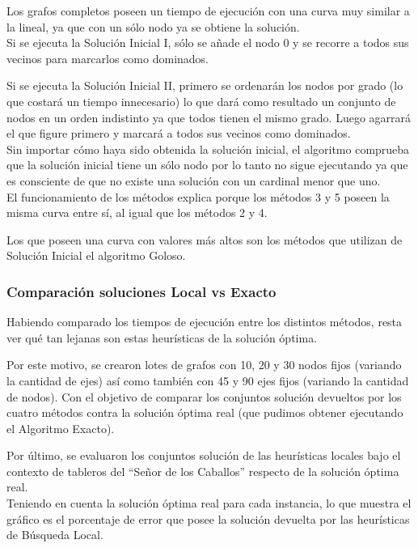 Los grafos completos poseen un tiempo de ejecución con una curva muy similar a la lineal, ya que con un sólo nodo ya se obtiene la solución.\\

Si se ejecuta la Solución Inicial I, sólo se añade el nodo 0 y se recorre a todos sus vecinos para marcarlos como dominados.

Si se ejecuta la Solución Inicial II, primero se ordenarán los nodos por grado (lo que costará un tiempo innecesario) lo que dará como resultado un conjunto de nodos en un orden indistinto ya que todos tienen el mismo grado. Luego agarrará el que figure primero y marcará a todos sus vecinos como dominados.\\

Sin importar cómo haya sido obtenida la solución inicial, el algoritmo comprueba que la solución inicial tiene un sólo nodo por lo tanto no sigue ejecutando ya que es consciente de que no existe una solución con un cardinal menor que uno.\\

El funcionamiento de los métodos explica porque los métodos 3 y 5 poseen la misma curva entre sí, al igual que los métodos 2 y 4.

Los que poseen una curva con valores más altos son los métodos que utilizan de Solución Inicial el algoritmo Goloso.
 
\newpage
\subsubsection{Comparaci\'on soluciones Local vs Exacto}


Habiendo comparado los tiempos de ejecuci\'on entre los distintos m\'etodos, resta ver qu\'e tan lejanas son estas heur\'isticas de la soluci\'on \'optima.

Por este motivo, se crearon lotes de grafos con 10, 20 y 30 nodos fijos (variando la cantidad de ejes) as\'i como tambi\'en con 45 y 90 ejes fijos (variando la cantidad de nodos). Con el objetivo de comparar los conjuntos solución devueltos por los cuatro métodos contra la solución óptima real (que pudimos obtener ejecutando el Algoritmo Exacto).

Por \'ultimo, se evaluaron los conjuntos soluci\'on de las heur\'isticas locales bajo el contexto de tableros del ``Se\~nor de los Caballos'' respecto de la soluci\'on \'optima real.\\

Teniendo en cuenta la soluci\'on \'optima real para cada instancia, lo que muestra el gr\'afico es el porcentaje de error que posee la soluci\'on devuelta por las heur\'isticas de B\'usqueda Local. \\

